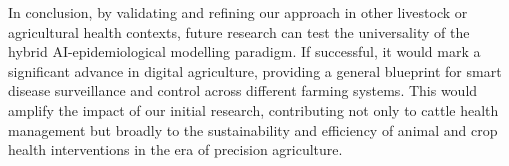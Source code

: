 In conclusion, by validating and refining our approach in other livestock or agricultural health contexts, future research can test the universality of the hybrid AI-epidemiological modelling paradigm. If successful, it would mark a significant advance in digital agriculture, providing a general blueprint for smart disease surveillance and control across different farming systems. This would amplify the impact of our initial research, contributing not only to cattle health management but broadly to the sustainability and efficiency of animal and crop health interventions in the era of precision agriculture.









\newpage\thispagestyle{empty}